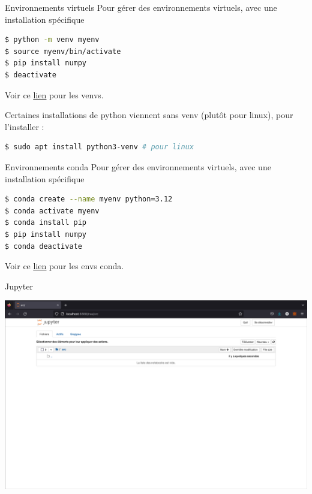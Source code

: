 \begin{frame}[fragile]{Environnements virtuels}
  Pour gérer des environnements virtuels, avec une installation spécifique
\begin{lstlisting}[language=bash, morekeywords={\$, python, pip, conda, deactivate}, numbers=none]
$ python -m venv myenv
$ source myenv/bin/activate
$ pip install numpy
$ deactivate
\end{lstlisting}
Voir ce
\underline{\href{https://docs.python.org/3/library/venv.html}{lien}}
pour les venvs.

Certaines installations de python viennent sans venv (plutôt pour linux), pour l'installer :

\begin{lstlisting}[language=bash, morekeywords={\$, python, pip, conda, deactivate}, numbers=none]
$ sudo apt install python3-venv # pour linux
\end{lstlisting}
\end{frame}

\begin{frame}[fragile]{Environnements conda}
  Pour gérer des environnements virtuels, avec une installation spécifique
\begin{lstlisting}[language=bash, morekeywords={\$, python, pip, conda}, numbers=none]
$ conda create --name myenv python=3.12
$ conda activate myenv
$ conda install pip
$ pip install numpy
$ conda deactivate
\end{lstlisting}
Voir ce 
\underline{\href{https://conda.io/projects/conda/en/latest/user-guide/tasks/manage-environments.html}{lien}}
pour les envs conda.
\end{frame}

\begin{frame}{Jupyter}
  \begin{center}
    \includegraphics[width=\textwidth]{img/jupyter-nb.png}
  \end{center}
\end{frame}

